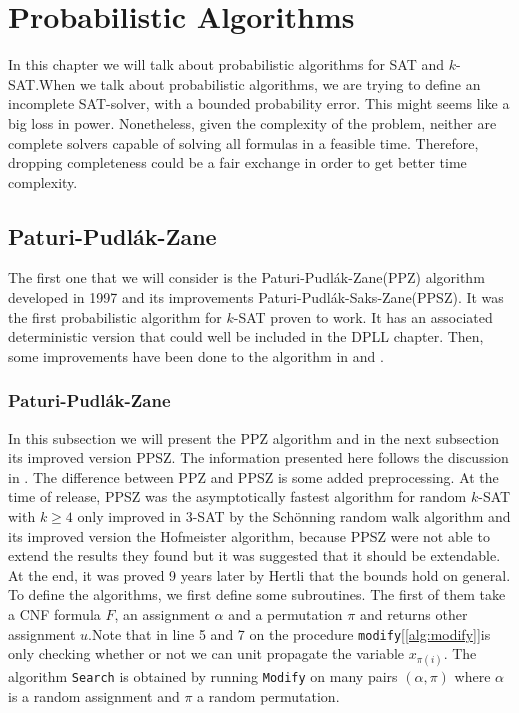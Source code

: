 \chapter{Probabilistic Algorithms}
\label{sec:prob}


In this chapter we will talk about probabilistic algorithms for SAT and $k$-SAT.When we talk about probabilistic algorithms, we are trying to define an incomplete SAT-solver, with a bounded probability error. This might seems like a big loss in power. Nonetheless, given the complexity of the problem, neither are complete solvers capable of solving all formulas in a feasible time. Therefore, dropping completeness could be a fair exchange in order to get better time complexity.\\


\section{Paturi-Pudlák-Zane}
The first one that we will consider is the Paturi-Pudlák-Zane(PPZ) algorithm \cite{paturi1997satisfiability} developed in 1997 and its improvements Paturi-Pudlák-Saks-Zane(PPSZ). It was the first probabilistic algorithm for $k$-SAT proven to work. It has an associated deterministic version that could well be included in the DPLL chapter. Then, some improvements have been done to the algorithm in \cite{paturi2005improved} and \cite{hertli20143}.\\

\subsection{Paturi-Pudlák-Zane}
\label{subsec:PPZ}
In this subsection we will present the PPZ algorithm and in the next subsection its improved version PPSZ. The information presented here follows the discussion in \cite{paturi2005improved}. The difference between PPZ and PPSZ is some added preprocessing. At the time of release, PPSZ was the asymptotically fastest algorithm for random $k$-SAT with $k \ge 4$ only improved in $3$-SAT by the Schönning random walk algorithm and its improved version the Hofmeister algorithm, because PPSZ were not able to extend the results they found but it was suggested that it should be extendable. At the end, it was proved 9 years later by Hertli \cite{hertli20143} that the bounds hold on general. \\


To define the algorithms, we first define some subroutines. The first of them take a CNF formula $F$, an assignment $\alpha$ and a permutation $\pi$ and returns other assignment $u$.Note that in line 5 and 7 on the procedure \texttt{modify}[\ref{alg:modify}]is only checking whether or not we can unit propagate the variable $x_{\pi(i)}$. The algorithm \texttt{Search} is obtained by running \texttt{Modify} on many pairs $(\alpha, \pi)$ where $\alpha$ is a random assignment and $\pi$ a random permutation.\\ 

